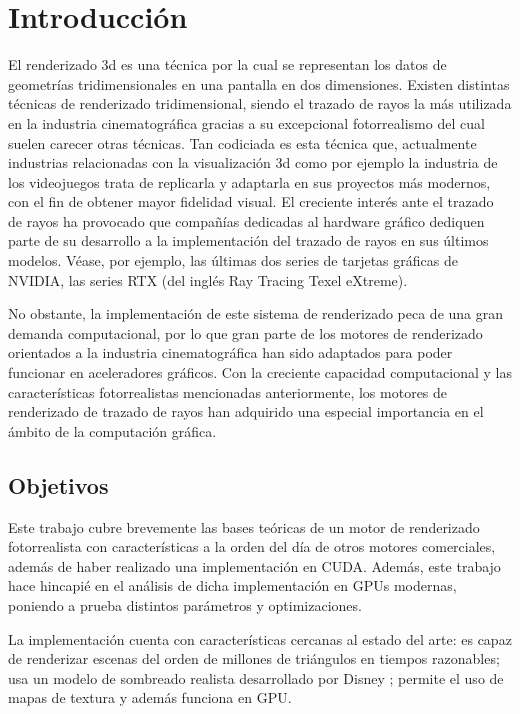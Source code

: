 \chapter{Introducción}
	
El renderizado 3d es una técnica por la cual se representan los datos de geometrías tridimensionales en una pantalla en dos dimensiones. Existen distintas técnicas de renderizado tridimensional, siendo el trazado de rayos la más utilizada en la industria cinematográfica gracias a su excepcional fotorrealismo del cual suelen carecer otras técnicas. Tan codiciada es esta técnica que, actualmente industrias relacionadas con la visualización 3d como por ejemplo la industria de los videojuegos trata de replicarla y adaptarla en sus proyectos más modernos, con el fin de obtener mayor fidelidad visual.
El creciente interés ante el trazado de rayos ha provocado que compañías dedicadas al hardware gráfico dediquen parte de su desarrollo a la implementación del trazado de rayos en sus últimos modelos. Véase, por ejemplo, las últimas dos series de tarjetas gráficas de NVIDIA, las series RTX (del inglés Ray Tracing Texel eXtreme).

No obstante, la implementación de este sistema de renderizado peca de una gran demanda computacional, por lo que gran parte de los motores de renderizado orientados a la industria cinematográfica han sido adaptados para poder funcionar en aceleradores gráficos. Con la creciente capacidad computacional y las características fotorrealistas mencionadas anteriormente, los motores de renderizado de trazado de rayos han adquirido una especial importancia en el ámbito de la computación gráfica.



\section{Objetivos}

Este trabajo cubre brevemente las bases teóricas de un motor de renderizado fotorrealista con características a la orden del día de otros motores comerciales, además de haber realizado una implementación en CUDA. Además, este trabajo hace hincapié en el análisis de dicha implementación en GPUs modernas, poniendo a prueba distintos parámetros y optimizaciones.

La implementación cuenta con características cercanas al estado del arte: es capaz de renderizar escenas del orden de millones de triángulos en tiempos razonables; usa un modelo de sombreado realista desarrollado por Disney \cite{burley2012physically}; permite el uso de mapas de textura y además funciona en GPU.

